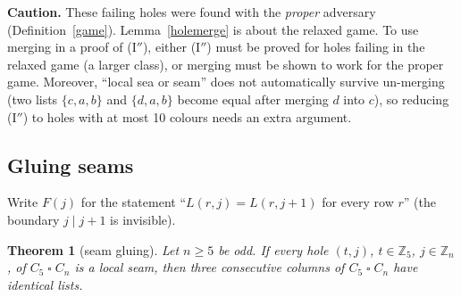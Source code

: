 \documentclass[11pt]{article}
\theoremstyle{plain}
\newtheorem{theorem}{Theorem}[section]
\theoremstyle{definition}
\theoremstyle{remark}
\newcommand{\T}{\mathbin{\square}}
\newcommand{\Z}{\mathbb{Z}}
\begin{document}
\textbf{Caution.} These failing holes were found with the \emph{proper} adversary (Definition~\ref{game}). Lemma~\ref{holemerge}
is about the relaxed game. To use merging in a proof of (I$''$), either (I$''$) must be proved for holes failing in the relaxed
game (a larger class), or merging must be shown to work for the proper game. Moreover, ``local sea or seam'' does not
automatically survive un-merging (two lists $\{c, a, b\}$ and $\{d, a, b\}$ become equal after merging $d$ into $c$), so
reducing (I$''$) to holes with at most 10 colours needs an extra argument.

\subsection{Gluing seams}

Write $F(j)$ for the statement ``$L(r, j) = L(r, j+1)$ for every row $r$'' (the boundary $j \mid j+1$ is invisible).

\begin{theorem}[seam gluing]\label{seamglue}
Let $n \ge 5$ be odd. If every hole $(t, j)$, $t \in \Z_5$, $j \in \Z_n$, of $C_5 \T C_n$ is a local seam, then three consecutive
columns of $C_5 \T C_n$ have identical lists.
\end{theorem}
\end{document}
